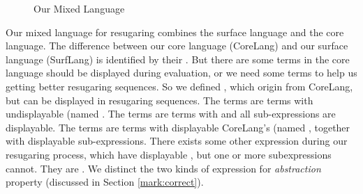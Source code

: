 \begin{figure}[t]
\begin{centering}
	\framebox[36em][c]{
		\parbox[t]{33em}{
			\[
			\begin{array}{lcl}
			\m{Exp} &::=& \m{DisplayableExp}\\
			&|& \m{UndisplayableExp}\\
\\
			\m{DisplayableExp} &::=& \m{SurfExp}\\
			&|& \m{CommonExp}
\\
			\m{UndisplayableExp} &::=& \m{CoreExp'}\\
			&|& \m{OtherSurfExp}\\
			&|& \m{OtherCommonExp}\\
\\
			\m{CoreExp} &::=& \m{CoreExp'}\\
						 &|& \m{CommonExp}\\
\\						
			\m{CoreExp'} &::=& (\m{CoreHead'}~\m{Exp}*)\\
\\
			\m{SurfExp} &::=& (\m{SurfHead}~\m{DisplayableExp}*)\\
\\
			\m{CommonExp} &::=& (\m{CommonHead}~\m{DisplayableExp}*)\\
			&|& c \qquad \note{// constant value}\\
			&|& x \qquad \note{// variable} \\
\\
			\m{OtherSurfExp} &::=& (\m{SurfHead}~\m{Exp}*~\m{UndisplayableExp}~\m{Exp}*)\\
\\
			\m{OtherCommonExp} &::=& (\m{CommonHead}~\m{Exp}*~\m{UndisplayableExp}~\m{Exp}*)
			\end{array}
			\]
		}
	}
\end{centering}
\caption{Our Mixed Language}
\label{fig:mix}
\end{figure}

Our mixed language for resugaring combines the surface language and the core language.
%
The difference between our core language (CoreLang) and our surface language (SurfLang) is identified by their . But there are some terms in the core language should be displayed during evaluation, or we need some terms to help us getting better resugaring sequences. So we defined , which origin from CoreLang, but can be displayed in resugaring sequences. The  terms are terms with undisplayable  (named . The  terms are terms with  and all sub-expressions are displayable. The  terms are terms with displayable CoreLang's  (named , together with displayable sub-expressions. There exists some other expression during our resugaring process, which have displayable , but one or more subexpressions cannot. They are . We distinct the two kinds of expression for \emph{abstraction} property (discussed in Section \ref{mark:correct}).

